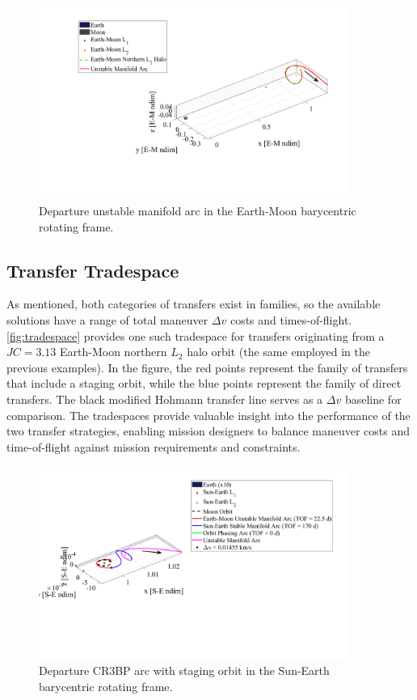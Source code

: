 \begin{figure}[H]
    \centering
    \includegraphics[width=0.9\textwidth]{figures/StagedEM.pdf}
    \caption{Departure unstable manifold arc in the Earth-Moon barycentric rotating frame.}
    \label{fig:stagedEM}
\end{figure}

\subsection{Transfer Tradespace}
As mentioned, both categories of transfers exist in families, so the available solutions have a
range of total maneuver $\Delta v$ costs and times-of-flight. \cref{fig:tradespace} provides one
such tradespace for transfers originating from a $JC=3.13$ Earth-Moon northern $L_{2}$ halo orbit
(the same employed in the previous examples). In the figure, the red points represent the family of
transfers that include a staging orbit, while the blue points represent the family of direct
transfers. The black modified Hohmann transfer line serves as a $\Delta v$ baseline for comparison.
The tradespaces provide valuable insight into the performance of the two transfer strategies,
enabling mission designers to balance maneuver costs and time-of-flight against mission
requirements and constraints.

\begin{figure}[H]
    \centering
    \includegraphics[width=0.9\textwidth]{figures/StagedSE.pdf}
    \caption{Departure CR3BP arc with staging orbit in the Sun-Earth barycentric rotating frame.}
    \label{fig:stagedSE}
\end{figure}

